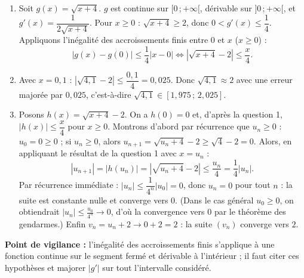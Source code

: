 \documentclass[11pt]{article}
\begin{document}
\begin{corrige}
\begin{enumerate}
\item Soit $g(x)=\sqrt{x+4}$. $g$ est continue sur $[0\,;+\infty[$, dérivable sur $]0\,;+\infty[$, et $g'(x)=\dfrac{1}{2\sqrt{x+4}}$. Pour $x\ge 0$ : $\sqrt{x+4}\ge 2$, donc $0<g'(x)\le \dfrac{1}{4}$.
Appliquons l'inégalité des accroissements finis entre $0$ et $x$ ($x\ge 0$) :
\[ |g(x)-g(0)|\le \frac{1}{4}|x-0| \iff \left|\sqrt{x+4}-2\right|\le \frac{x}{4}. \]

\item Avec $x=0{,}1$ : $\left|\sqrt{4{,}1}-2\right|\le \dfrac{0{,}1}{4}=0{,}025$.
Donc $\sqrt{4{,}1}\approx 2$ avec une erreur majorée par $0{,}025$, c'est-à-dire $\sqrt{4{,}1}\in[1{,}975\,;\,2{,}025]$.

\item Posons $h(x)=\sqrt{x+4}-2$. On a $h(0)=0$ et, d'après la question 1, $|h(x)|\le \dfrac{x}{4}$ pour $x\ge 0$.
Montrons d'abord par récurrence que $u_n\ge 0$ : $u_0=0\ge 0$ ; si $u_n\ge 0$, alors $u_{n+1}=\sqrt{u_n+4}-2\ge \sqrt{4}-2=0$.
Alors, en appliquant le résultat de la question 1 avec $x=u_n$ :
\[ |u_{n+1}|=|h(u_n)|=\left|\sqrt{u_n+4}-2\right|\le \frac{u_n}{4}=\frac{1}{4}|u_n|. \]
Par récurrence immédiate : $|u_n|\le \dfrac{1}{4^n}|u_0|=0$, donc $u_n=0$ pour tout $n$ : la suite est constante nulle et converge vers $0$. (Dans le cas général $u_0\ge 0$, on obtiendrait $|u_n|\le \frac{u_0}{4^n}\to 0$, d'où la convergence vers $0$ par le théorème des gendarmes.)
Enfin $v_n=u_n+2\to 0+2=2$ : la suite $(v_n)$ converge vers $2$.
\end{enumerate}
\textbf{Point de vigilance :} l'inégalité des accroissements finis s'applique à une fonction continue sur le segment fermé et dérivable à l'intérieur ; il faut citer ces hypothèses et majorer $|g'|$ sur tout l'intervalle considéré.
\end{corrige}
\end{document}
